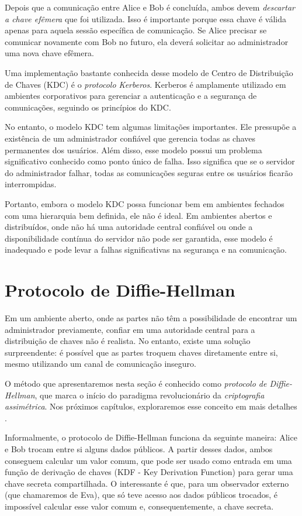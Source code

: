 Depois que a comunicação entre Alice e Bob é concluída, ambos devem {\em descartar a chave efêmera} que foi utilizada.
Isso é importante porque essa chave é válida apenas para aquela sessão específica de comunicação.
Se Alice precisar se comunicar novamente com Bob no futuro, ela deverá solicitar ao administrador uma nova chave efêmera.

Uma implementação bastante conhecida desse modelo de Centro de Distribuição de Chaves (KDC) é o {\em protocolo Kerberos}.
Kerberos é amplamente utilizado em ambientes corporativos para gerenciar a autenticação e a segurança de comunicações, seguindo os princípios do KDC.

No entanto, o modelo KDC tem algumas limitações importantes.
Ele pressupõe a existência de um administrador confiável que gerencia todas as chaves permanentes dos usuários.
Além disso, esse modelo possui um problema significativo conhecido como ponto único de falha.
Isso significa que se o servidor do administrador falhar, todas as comunicações seguras entre os usuários ficarão interrompidas.

Portanto, embora o modelo KDC possa funcionar bem em ambientes fechados com uma hierarquia bem definida, ele não é ideal.
Em ambientes abertos e distribuídos, onde não há uma autoridade central confiável ou onde a disponibilidade contínua do servidor não pode ser garantida, esse modelo é inadequado e pode levar a falhas significativas na segurança e na comunicação.

\section{Protocolo de Diffie-Hellman}
\label{sec:diffie-hellman}


Em um ambiente aberto, onde as partes não têm a possibilidade de encontrar um administrador previamente, confiar em uma autoridade central para a distribuição de chaves não é realista.
No entanto, existe uma solução surpreendente:
é possível que as partes troquem chaves diretamente entre si, mesmo utilizando um canal de comunicação inseguro.

O método que apresentaremos nesta seção é conhecido como {\em protocolo de Diffie-Hellman}, que marca o início do paradigma revolucionário da {\em criptografia assimétrica}.
Nos próximos capítulos, exploraremos esse conceito em mais detalhes \cite{Diffie76}.

Informalmente, o protocolo de Diffie-Hellman funciona da seguinte maneira:
Alice e Bob trocam entre si alguns dados públicos.
A partir desses dados, ambos conseguem calcular um valor comum, que pode ser usado como entrada em uma função de derivação de chaves (KDF - Key Derivation Function) para gerar uma chave secreta compartilhada.
O interessante é que, para um observador externo (que chamaremos de Eva), que só teve acesso aos dados públicos trocados, é impossível calcular esse valor comum e, consequentemente, a chave secreta.

